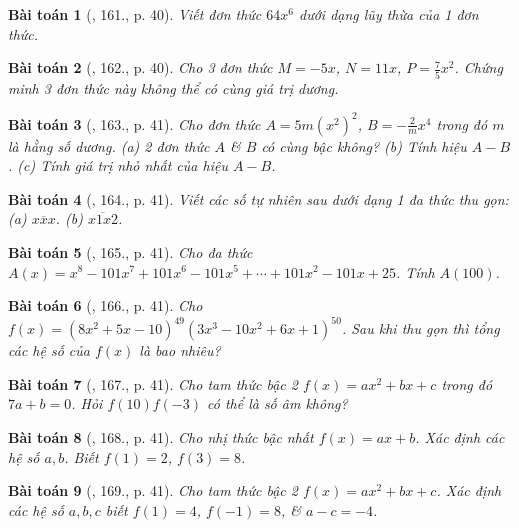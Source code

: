 \documentclass{article}
\newtheorem{baitoan}{Bài toán}
\begin{document}
\begin{baitoan}[\cite{Tuyen_Toan_7}, 161., p. 40]
	Viết đơn thức $64x^6$ dưới dạng lũy thừa của 1 đơn thức.
\end{baitoan}

\begin{baitoan}[\cite{Tuyen_Toan_7}, 162., p. 40]
	Cho 3 đơn thức $M = -5x$, $N = 11x$, $P = \frac{7}{5}x^2$. Chứng minh 3 đơn thức này không thể có cùng giá trị dương.
\end{baitoan}

\begin{baitoan}[\cite{Tuyen_Toan_7}, 163., p. 41]
	Cho đơn thức $A = 5m(x^2)^2$, $B = -\frac{2}{m}x^4$ trong đó $m$ là hằng số dương. (a) 2 đơn thức $A$ \& $B$ có cùng bậc không? (b) Tính hiệu $A - B$. (c) Tính giá trị nhỏ nhất của hiệu $A - B$.
\end{baitoan}

\begin{baitoan}[\cite{Tuyen_Toan_7}, 164., p. 41]
	Viết các số tự nhiên sau dưới dạng 1 đa thức thu gọn: (a) $\overline{xxx}$. (b) $\overline{x1x2}$.
\end{baitoan}

\begin{baitoan}[\cite{Tuyen_Toan_7}, 165., p. 41]
	Cho đa thức $A(x) = x^8 - 101x^7 + 101x^6 - 101x^5 + \cdots + 101x^2 - 101x + 25$. Tính $A(100)$.
\end{baitoan}

\begin{baitoan}[\cite{Tuyen_Toan_7}, 166., p. 41]
	Cho $f(x) = (8x^2 + 5x - 10)^{49}(3x^3 - 10x^2 + 6x + 1)^{50}$. Sau khi thu gọn thì tổng các hệ số của $f(x)$ là bao nhiêu?
\end{baitoan}

\begin{baitoan}[\cite{Tuyen_Toan_7}, 167., p. 41]
	Cho tam thức bậc 2 $f(x) = ax^2 + bx + c$ trong đó $7a + b = 0$. Hỏi $f(10)f(-3)$ có thể là số âm không?
\end{baitoan}

\begin{baitoan}[\cite{Tuyen_Toan_7}, 168., p. 41]
	Cho nhị thức bậc nhất $f(x) = ax + b$. Xác định các hệ số $a,b$. Biết $f(1) = 2$, $f(3) = 8$.
\end{baitoan}

\begin{baitoan}[\cite{Tuyen_Toan_7}, 169., p. 41]
	Cho tam thức bậc 2 $f(x) = ax^2 + bx + c$. Xác định các hệ số $a,b,c$ biết $f(1) = 4$, $f(-1) = 8$, \& $a - c = -4$.
\end{baitoan}
\end{document}
